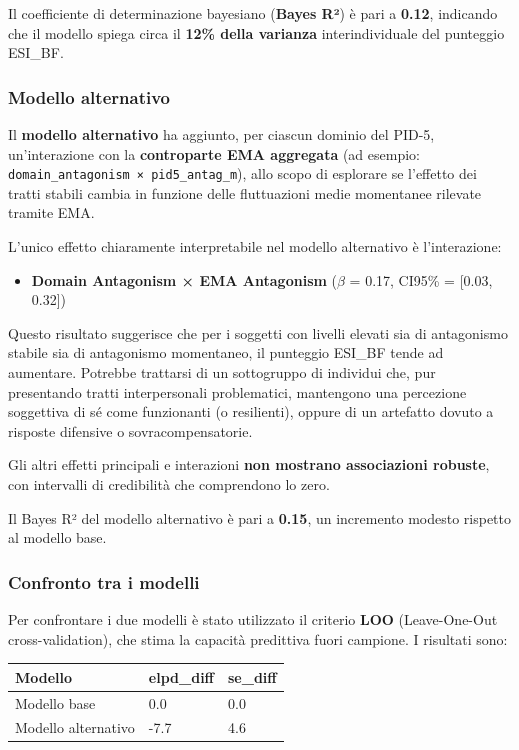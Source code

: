 \documentclass[
  11pt,
  a4paper,
  onecolumn]{article}
\providecommand{\tightlist}{%
  \setlength{\itemsep}{0pt}\setlength{\parskip}{0pt}}
\begin{document}
Il coefficiente di determinazione bayesiano (\textbf{Bayes R²}) è pari a
\textbf{0.12}, indicando che il modello spiega circa il \textbf{12\%
della varianza} interindividuale del punteggio ESI\_BF.

\subsubsection{Modello alternativo}\label{modello-alternativo}

Il \textbf{modello alternativo} ha aggiunto, per ciascun dominio del
PID-5, un'interazione con la \textbf{controparte EMA aggregata} (ad
esempio: \texttt{domain\_antagonism\ ×\ pid5\_antag\_m}), allo scopo di
esplorare se l'effetto dei tratti stabili cambia in funzione delle
fluttuazioni medie momentanee rilevate tramite EMA.

L'unico effetto chiaramente interpretabile nel modello alternativo è
l'interazione:

\begin{itemize}
\tightlist
\item
  \textbf{Domain Antagonism × EMA Antagonism} (\(\beta\) = 0.17, CI95\%
  = {[}0.03, 0.32{]})
\end{itemize}

Questo risultato suggerisce che per i soggetti con livelli elevati sia
di antagonismo stabile sia di antagonismo momentaneo, il punteggio
ESI\_BF tende ad aumentare. Potrebbe trattarsi di un sottogruppo di
individui che, pur presentando tratti interpersonali problematici,
mantengono una percezione soggettiva di sé come funzionanti (o
resilienti), oppure di un artefatto dovuto a risposte difensive o
sovracompensatorie.

Gli altri effetti principali e interazioni \textbf{non mostrano
associazioni robuste}, con intervalli di credibilità che comprendono lo
zero.

Il Bayes R² del modello alternativo è pari a \textbf{0.15}, un
incremento modesto rispetto al modello base.

\subsubsection{Confronto tra i modelli}\label{confronto-tra-i-modelli}

Per confrontare i due modelli è stato utilizzato il criterio
\textbf{LOO} (Leave-One-Out cross-validation), che stima la capacità
predittiva fuori campione. I risultati sono:

\begin{longtable}[]{@{}lll@{}}
\toprule\noalign{}
Modello & elpd\_diff & se\_diff \\
\midrule\noalign{}
\endhead
\bottomrule\noalign{}
\endlastfoot
Modello base & 0.0 & 0.0 \\
Modello alternativo & -7.7 & 4.6 \\
\end{longtable}
\end{document}

